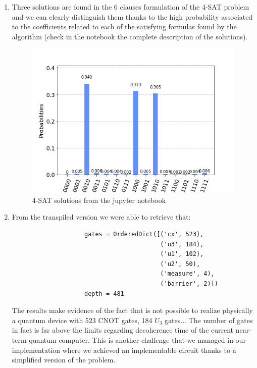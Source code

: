 \documentclass[english]{article}
\begin{document}
				\begin{enumerate}
					\item Three solutions are found in the 6 clauses formulation of the 4-SAT problem and we can clearly distinguish them thanks to the high probability associated to the coefficients related to each of the satisfying formulas found by the algorithm (check in the notebook the complete description of the solutions).
					\begin{figure}[h]
						\centering
						\includegraphics[scale=0.5]{NotebookHistogram}
						\caption{4-SAT solutions from the jupyter notebook}
					\end{figure}
				
					\item From the transpiled version we were able to retrieve that:
					\begin{verbatim}
					gates = OrderedDict([('cx', 523), 
					                     ('u3', 184), 
					                     ('u1', 102), 
					                     ('u2', 50), 
					                     ('measure', 4), 
					                     ('barrier', 2)])
					depth = 481
					\end{verbatim}
					The results make evidence of the fact that is not possible to realize physically a quantum device with 523 CNOT gates, 184 $U_3$ gates... The number of gates in fact is far above the limits regarding decoherence time of the current near-term quantum computer. This is another challenge that we managed in our implementation where we achieved an implementable circuit thanks to a simplified version of the problem.
				\end{enumerate} 
		
\end{document}
